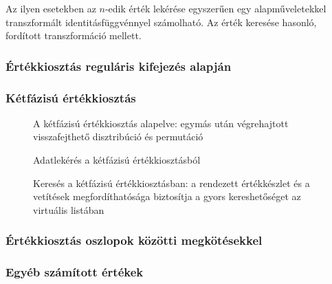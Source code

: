 \documentclass[
    parspace, %
    noindent, %
]{elteiktdk}[2023/10/30]
\begin{document}
Az ilyen esetekben az $n$-edik érték lekérése egyszerűen
egy alapműveletekkel transzformált identitásfüggvénnyel számolható.
Az érték keresése hasonló, fordított transzformáció mellett.


\subsubsection{Értékkiosztás reguláris kifejezés alapján}


\subsubsection{Kétfázisú értékkiosztás}


\begin{figure}
\centering

\caption{A kétfázisú értékkiosztás alapelve: egymás után végrehajtott visszafejthető disztribúció és permutáció}
\label{A kétfázisú értékkiosztás alapelve}
\end{figure}

\begin{figure}
\centering

\caption{Adatlekérés a kétfázisú értékkiosztásból}
\label{Adatlekérés a kétfázisú értékkiosztásból}
\end{figure}

\begin{figure}
\centering

\caption{Keresés a kétfázisú értékkiosztásban: a rendezett értékkészlet és a vetítések megfordíthatósága biztosítja a gyors kereshetőséget az virtuális listában}
\label{Keresés a kétfázisú értékkiosztásban}
\end{figure}

\subsubsection{Értékkiosztás oszlopok közötti megkötésekkel}


\subsubsection{Egyéb számított értékek}
\end{document}
